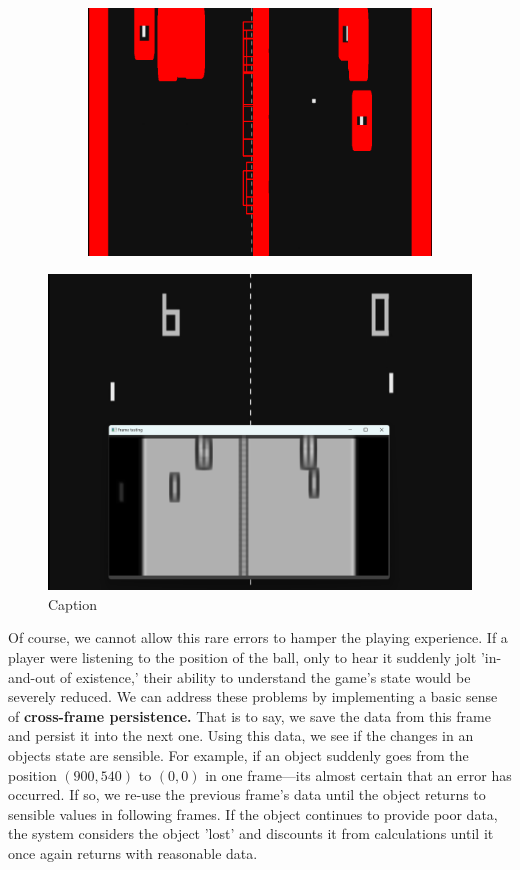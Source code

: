 \documentclass{report}
\newcommand{\tech}[1]{\textbf{#1}}
\begin{document}
\begin{figure}
\begin{subfigure}{\linewidth}
        \includegraphics[height=0.3\textheight]{tempHigh.png}
    \end{subfigure}
    \label{fig:template}    
\end{figure}

\begin{figure}
    \includegraphics[width=\linewidth]{tempData.png}
    \caption{Caption}
    \label{fig:tempData}
\end{figure}


Of course, we cannot allow this rare errors to hamper the playing experience. If a player were listening to the position of the ball, only to hear it suddenly jolt 'in-and-out of existence,' their ability to understand the game's state would be severely reduced. We can address these problems by implementing a basic sense of \tech{cross-frame persistence.} That is to say, we save the data from this frame and persist it into the next one. Using this data, we see if the changes in an objects state are sensible. For example, if an object suddenly goes from the position $(900, 540)$ to $(0, 0)$ in one frame---its almost certain that an error has occurred. If so, we re-use the previous frame's data until the object returns to sensible values in following frames. If the object continues to provide poor data, the system considers the object 'lost' and discounts it from calculations until it once again returns with reasonable data. 
\end{document}
